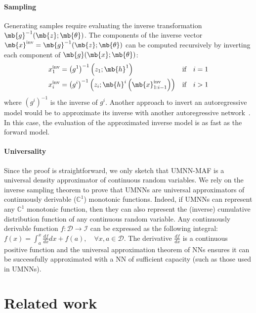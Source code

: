 \paragraph{Sampling}
Generating samples require evaluating the inverse transformation $\mb{g}^{-1}(\mb{z}; \mb{\theta})$.
The components of the inverse vector $\mb{x}^{\text{inv}} = \mb{g}^{-1}(\mb{z}; \mb{\theta})$ can be computed recursively by inverting each component of $\mb{g}(\mb{x}; \mb{\theta})$:
\begin{align}
    x_1^{\text{inv}} &= \left(g^1\right)^{-1}\brac{z_1; \mb{h}^1}&\text{if} \quad i = 1\\
    x_{i}^{\text{inv}} &= \left(g^{i}\right)^{-1}\brac{z_{i}; \mb{h}^{i }\brac{\mb{x}_{1:i-1}^{\text{inv}}}}&\text{if} \quad i > 1
\end{align}
where $(g^i)^{-1}$ is the inverse of $g^i$. Another approach to invert an autoregressive model would be to approximate its inverse with another autoregressive network~\citep{van_den_oord_parallel_2018}. In this case, the evaluation of the approximated inverse model is as fast as the forward model.

\paragraph{Universality}
Since the proof is straightforward, we only sketch that UMNN-MAF is a universal density approximator of continuous random variables. We rely on the inverse sampling theorem to prove that UMNNs are universal approximators of continuously derivable ($\mathbb{C}^1$) monotonic functions. Indeed, if UMNNs can represent any $\mathbb{C}^1$ monotonic function, then they can also represent the (inverse) cumulative distribution function of any continuous random variable. Any continuously derivable function $f: \mathcal{D}\rightarrow \mathcal{I}$ can be expressed as the following integral: $ f(x) = \int^x_a \frac{df}{dx} dx + f(a), \quad \forall x, a \in \mathcal{D}.$ The derivative $\frac{df}{dx}$ is a continuous positive function and the universal approximation theorem of NNs ensures it can be successfully approximated with a NN of sufficient capacity (such as those used in UMNNs).

\section{Related work}

